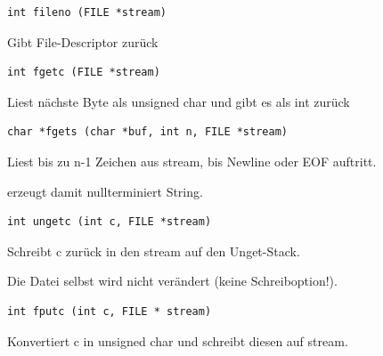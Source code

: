 \begin{multicols*}{5}
			

			\vspace{-6pt}
			\begin{lstlisting}
int fileno (FILE *stream)
			\end{lstlisting}
			\vspace{-6pt}
			\begin{compactitem}[$\bullet$]
			\item Gibt File-Descriptor zurück
			\end{compactitem}


			\vspace{-6pt}
			\begin{lstlisting}
int fgetc (FILE *stream)
			\end{lstlisting}
			\vspace{-6pt}
			\begin{compactitem}[$\bullet$]
			\item Liest nächste Byte als unsigned char und gibt es als int zurück
			\end{compactitem}


			\vspace{-6pt}
			\begin{lstlisting}
char *fgets (char *buf, int n, FILE *stream)
			\end{lstlisting}
			\vspace{-6pt}
			\begin{compactitem}[$\bullet$]
			\item Liest bis zu n-1 Zeichen aus stream, bis Newline oder EOF auftritt.
			\item erzeugt damit nullterminiert String.
			\end{compactitem}



			\vspace{-6pt}
			\begin{lstlisting}
int ungetc (int c, FILE *stream)
			\end{lstlisting}
			\vspace{-6pt}
			\begin{compactitem}[$\bullet$]
			\item Schreibt c zurück in den stream auf den Unget-Stack. 
			\item Die Datei selbst wird nicht verändert (keine Schreiboption!). 
			\end{compactitem}


			\vspace{-6pt}
			\begin{lstlisting}
int fputc (int c, FILE * stream)
			\end{lstlisting}
			\vspace{-6pt}
			\begin{compactitem}[$\bullet$]
			\item Konvertiert c in unsigned char und schreibt diesen auf stream.
			\end{compactitem}



\end{multicols*}
